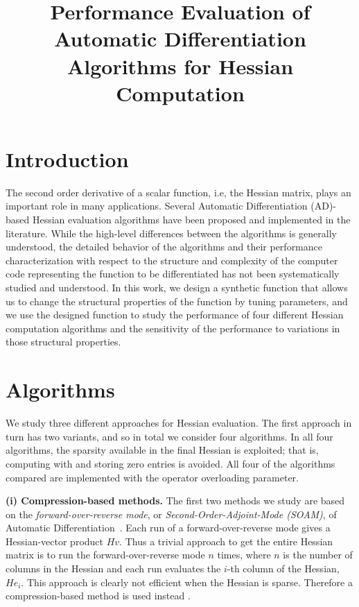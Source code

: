 \documentclass[final,leqno,onefignum,onetabnum]{siamart}
\begin{document}
\title{Performance Evaluation of Automatic Differentiation Algorithms for Hessian Computation}
\maketitle

\section*{Introduction}
The second order derivative of a scalar function, i.e, the Hessian matrix, plays 
an important role in many applications. 
Several Automatic Differentiation (AD)-based Hessian evaluation algorithms have been proposed and implemented in the literature. While the high-level differences between the algorithms is generally understood, the detailed behavior of the algorithms and their performance characterization with respect to the structure and complexity of the computer code  representing the function to be differentiated has not been systematically studied and understood. In this work, we design a synthetic function that allows us to change the structural properties of the function by tuning parameters, and we use the designed function to study the performance of four different Hessian computation algorithms and the sensitivity of the performance to variations in those structural properties.

\section*{Algorithms}

We study three different approaches for Hessian evaluation. The first approach in turn has two variants, and so in total we consider four algorithms. In all four algorithms, 
the sparsity available in the final Hessian is exploited; that is, computing with and storing zero entries is avoided. All four of the algorithms compared are implemented with the operator overloading parameter. 

{\bf (i) Compression-based methods. }
The first two methods we study are based on the {\em forward-over-reverse mode}, or {\em Second-Order-Adjoint-Mode (SOAM)}, of Automatic Differentiation~\cite{griewank2008evaluating, naumann2012art}. Each run of a forward-over-reverse mode gives a Hessian-vector product $Hv$. Thus a trivial approach to get the entire Hessian matrix is to run the forward-over-reverse mode $n$ times, where $n$ is the number of columns in the Hessian and each run evaluates the $i$-th column of the Hessian, $He_i$. This approach is clearly not efficient  when the Hessian is sparse.  Therefore a compression-based method is used instead \cite{gebremedhin2009efficient}. 
\end{document}
